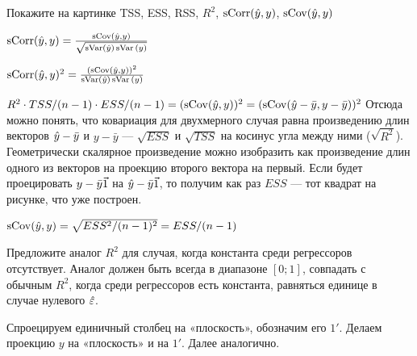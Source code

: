 \begin{problem}
Покажите на картинке TSS, ESS, RSS, $R^2$, $\operatorname{sCorr}(\hat{y},y)$, $\operatorname{sCov}(\hat{y},y)$





\begin{sol}
$\operatorname{sCorr}(\hat{y}, y)=\frac{\operatorname{sCov}(\hat{y}, y)}{\sqrt{\operatorname{sVar}(\hat{y})\operatorname{sVar}{(y)}}}$

$\operatorname{sCorr}(\hat{y}, y)^2=\frac{(\operatorname{sCov}(\hat{y}, y))^2}{\operatorname{sVar}(\hat{y})\operatorname{sVar}{(y)}} $

$R^2\cdot TSS/(n-1)\cdot ESS/(n-1)=(\operatorname{sCov}(\hat{y}, y))^2=(\operatorname{sCov}(\hat{y}-\bar y, y-\bar y))^2$
Отсюда можно понять, что ковариация для двухмерного случая равна произведению длин векторов $\hat{y}-\bar y$ и $y-\bar y$ — $\sqrt{ESS}$ и $\sqrt{TSS}$ на косинус угла между ними ($\sqrt{R^2}$). Геометрически скалярное произведение можно изобразить как произведение длин одного из векторов на проекцию второго вектора на первый. Если будет проецировать $y-\bar y\v1$ на $\hy-\bar y\v1$, то получим как раз $ESS$ — тот квадрат на рисунке, что уже построен.


$\operatorname{sCov}(\hat{y}, y)=\sqrt{ESS^2/(n-1)^2}=ESS/(n-1)$


\end{sol}
\end{problem}


\begin{problem}
Предложите аналог $R^2$ для случая, когда константа среди регрессоров отсутствует. Аналог должен быть всегда в диапазоне $[0;1]$, совпадать с обычным $R^2$, когда среди регрессоров есть константа, равняться единице в случае нулевого $\hat{\varepsilon}$.


\begin{sol}
Спроецируем единичный столбец на «плоскость», обозначим его $1'$. Делаем проекцию $y$ на «плоскость» и на $1'$. Далее аналогично.
\end{sol}
\end{problem}



